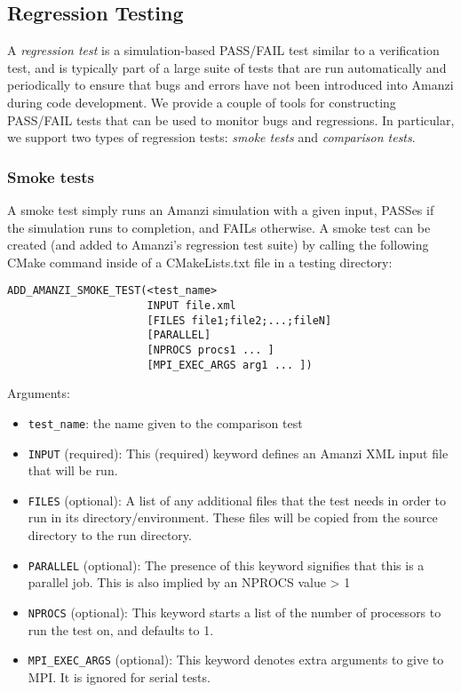 \subsection{Regression Testing}
A {\em regression test} is a simulation-based PASS/FAIL test similar to a 
verification test, and is typically part of a large suite of tests that are run 
automatically and periodically to ensure that bugs and errors have not been 
introduced into Amanzi during code development. We provide a couple of tools for 
constructing PASS/FAIL tests that can be used to monitor bugs and regressions. In 
particular, we support two types of regression tests: {\em smoke tests} and 
{\em comparison tests}.

\subsubsection{Smoke tests}
A smoke test simply runs an Amanzi simulation with a given input, PASSes if 
the simulation runs to completion, and FAILs otherwise. A smoke test can be created
(and added to Amanzi's regression test suite) by calling the following CMake command 
inside of a CMakeLists.txt file in a testing directory:

\begin{lstlisting}
ADD_AMANZI_SMOKE_TEST(<test_name> 
                      INPUT file.xml
                      [FILES file1;file2;...;fileN]
                      [PARALLEL] 
                      [NPROCS procs1 ... ]
                      [MPI_EXEC_ARGS arg1 ... ])
\end{lstlisting}

Arguments:
\begin{itemize}
\item \verb|test_name|: the name given to the comparison test 
\item \verb|INPUT| (required): This (required) keyword defines an Amanzi XML input file that will 
      be run.
\item \verb|FILES| (optional): A list of any additional files that the test needs in order 
      to run in its directory/environment. These files will be copied from the source 
      directory to the run directory.
\item \verb|PARALLEL| (optional): The presence of this keyword signifies that this is 
      a parallel job. This is also implied by an NPROCS value > 1
\item \verb|NPROCS| (optional): This keyword starts a list of the number of processors to
      run the test on, and defaults to 1.
\item \verb|MPI_EXEC_ARGS| (optional): This keyword denotes extra arguments to give to
      MPI. It is ignored for serial tests.
\end{itemize}

